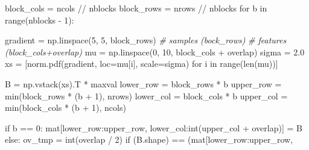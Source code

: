 \documentclass[
]{article}
\newenvironment{Shaded}{}{}
\newcommand{\BuiltInTok}[1]{\textcolor[rgb]{0.65,0.15,0.64}{#1}}
\newcommand{\CommentTok}[1]{\textcolor[rgb]{0.63,0.63,0.65}{\textit{#1}}}
\newcommand{\ControlFlowTok}[1]{\textcolor[rgb]{0.65,0.15,0.64}{#1}}
\newcommand{\DecValTok}[1]{\textcolor[rgb]{0.60,0.41,0.00}{#1}}
\newcommand{\FloatTok}[1]{\textcolor[rgb]{0.60,0.41,0.00}{#1}}
\newcommand{\KeywordTok}[1]{\textcolor[rgb]{0.65,0.15,0.64}{#1}}
\newcommand{\NormalTok}[1]{\textcolor[rgb]{0.22,0.23,0.26}{#1}}
\newcommand{\OperatorTok}[1]{\textcolor[rgb]{0.65,0.15,0.64}{#1}}
\begin{document}
\begin{Shaded}
\begin{Highlighting}[numbers=left,,firstnumber=127,]
\NormalTok{    block\_cols }\OperatorTok{=}\NormalTok{ ncols }\OperatorTok{//}\NormalTok{ nblocks}
\NormalTok{    block\_rows }\OperatorTok{=}\NormalTok{ nrows }\OperatorTok{//}\NormalTok{ nblocks}
    \ControlFlowTok{for}\NormalTok{ b }\KeywordTok{in} \BuiltInTok{range}\NormalTok{(nblocks }\OperatorTok{{-}} \DecValTok{1}\NormalTok{):}

\NormalTok{      gradient }\OperatorTok{=}\NormalTok{ np.linspace(}\DecValTok{5}\NormalTok{, }\DecValTok{5}\NormalTok{, block\_rows)  }\CommentTok{\# samples (bock\_rows)}
      \CommentTok{\# features (block\_cols+overlap)}
\NormalTok{      mu }\OperatorTok{=}\NormalTok{ np.linspace(}\DecValTok{0}\NormalTok{, }\DecValTok{10}\NormalTok{, block\_cols }\OperatorTok{+}\NormalTok{ overlap)}
\NormalTok{      sigma }\OperatorTok{=} \FloatTok{2.0}
\NormalTok{      xs }\OperatorTok{=}\NormalTok{ [norm.pdf(gradient, loc}\OperatorTok{=}\NormalTok{mu[i], scale}\OperatorTok{=}\NormalTok{sigma)}
            \ControlFlowTok{for}\NormalTok{ i }\KeywordTok{in} \BuiltInTok{range}\NormalTok{(}\BuiltInTok{len}\NormalTok{(mu))]}

\NormalTok{      B }\OperatorTok{=}\NormalTok{ np.vstack(xs).T }\OperatorTok{*}\NormalTok{ maxval}
\NormalTok{              lower\_row }\OperatorTok{=}\NormalTok{ block\_rows }\OperatorTok{*}\NormalTok{ b}
\NormalTok{              upper\_row }\OperatorTok{=} \BuiltInTok{min}\NormalTok{(block\_rows }\OperatorTok{*}\NormalTok{ (b }\OperatorTok{+} \DecValTok{1}\NormalTok{), nrows)}
\NormalTok{              lower\_col }\OperatorTok{=}\NormalTok{ block\_cols }\OperatorTok{*}\NormalTok{ b}
\NormalTok{              upper\_col }\OperatorTok{=} \BuiltInTok{min}\NormalTok{(block\_cols }\OperatorTok{*}\NormalTok{ (b }\OperatorTok{+} \DecValTok{1}\NormalTok{), ncols)}

              \ControlFlowTok{if}\NormalTok{ b }\OperatorTok{==} \DecValTok{0}\NormalTok{:}
\NormalTok{                  mat[lower\_row:upper\_row, lower\_col:}\BuiltInTok{int}\NormalTok{(upper\_col }\OperatorTok{+}\NormalTok{ overlap)] }\OperatorTok{=}\NormalTok{ B}
              \ControlFlowTok{else}\NormalTok{:}
\NormalTok{                  ov\_tmp }\OperatorTok{=} \BuiltInTok{int}\NormalTok{(overlap }\OperatorTok{/} \DecValTok{2}\NormalTok{)}
                  \ControlFlowTok{if}\NormalTok{ (B.shape) }\OperatorTok{==}\NormalTok{ (mat[lower\_row:upper\_row,}
\end{Highlighting}
\end{Shaded}
\end{document}
